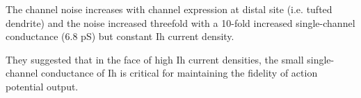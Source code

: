 The channel noise increases with channel expression at distal site (i.e. tufted
dendrite) and the noise increased threefold with a 10-fold increased
single-channel conductance (6.8 pS) but constant Ih current density.

They suggested that in the face of high Ih current densities, the small
single-channel conductance of Ih is critical for maintaining the fidelity of
action potential output.


